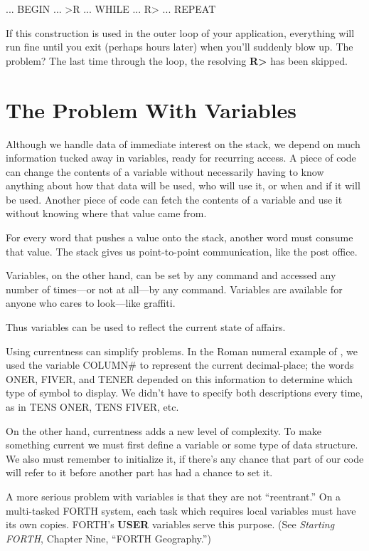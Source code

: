 \begin{Code}
... BEGIN ... >R ... WHILE ... R> ... REPEAT
\end{Code}
If this construction is used in the outer loop of your application,
everything will run fine until you exit (perhaps hours later) when you'll
suddenly blow up. The problem? The last time through the loop, the
resolving \textbf{R>} has been skipped.

\section{The Problem With Variables}

Although we handle data of immediate interest on the stack, we depend
on much information tucked away in variables, ready for recurring access.
A piece of code can change the contents of a variable without
necessarily having to know anything about how that data will be used,
who will use it, or when and if it will be used. Another piece of code can
fetch the contents of a variable and use it without knowing where that
value came from.

For every word that pushes a value onto the stack, another word
must consume that value. The stack gives us point-to-point communication,
like the post office.

Variables, on the other hand, can be set by any command and accessed
any number of times---or not at all---by any command. Variables
are available for anyone who cares to look---like graffiti.

Thus variables can be used to reflect the current state of affairs.

Using currentness can simplify problems. In the Roman numeral example
of , we used the variable COLUMN\# to represent the
current decimal-place; the words ONER, FIVER, and TENER depended
on this information to determine which type of symbol to display. We
didn't have to specify both descriptions every time, as in TENS ONER,
TENS FIVER, etc.

On the other hand, currentness adds a new level of complexity. To
make something current we must first define a variable or some type of
data structure. We also must remember to initialize it, if there's any
chance that part of our code will refer to it before another part has had a
chance to set it.

A more serious problem with variables is that they are not ``reentrant.''
On a multi-tasked FORTH system, each task which requires
local variables must have its own copies. FORTH's \textbf{USER} variables
serve this purpose. (See \emph{Starting FORTH}, Chapter Nine, ``FORTH
Geography.'')

